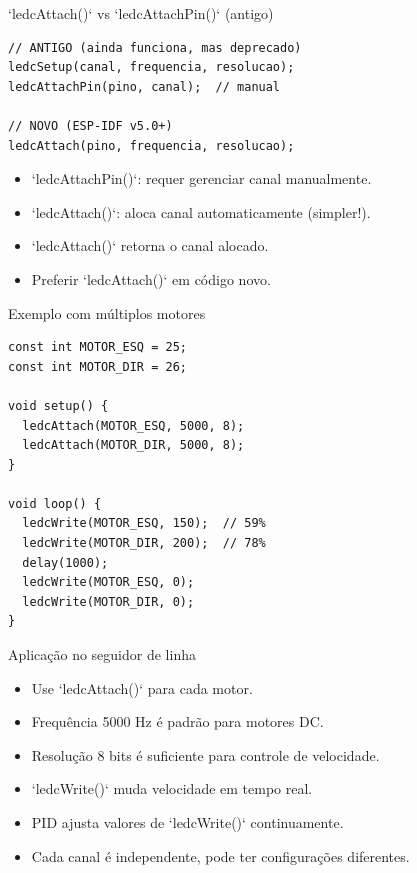 \documentclass[10pt]{beamer}
\begin{document}
\begin{frame}[fragile]{`ledcAttach()` vs `ledcAttachPin()` (antigo)}
\begin{lstlisting}
// ANTIGO (ainda funciona, mas deprecado)
ledcSetup(canal, frequencia, resolucao);
ledcAttachPin(pino, canal);  // manual

// NOVO (ESP-IDF v5.0+)
ledcAttach(pino, frequencia, resolucao);
\end{lstlisting}

  \begin{itemize}
    \item `ledcAttachPin()`: requer gerenciar canal manualmente.
    \item `ledcAttach()`: aloca canal automaticamente (simpler!).
    \item `ledcAttach()` retorna o canal alocado.
    \item Preferir `ledcAttach()` em código novo.
  \end{itemize}
\end{frame}

\begin{frame}[fragile]{Exemplo com múltiplos motores}
\begin{lstlisting}
const int MOTOR_ESQ = 25;
const int MOTOR_DIR = 26;

void setup() {
  ledcAttach(MOTOR_ESQ, 5000, 8);
  ledcAttach(MOTOR_DIR, 5000, 8);
}

void loop() {
  ledcWrite(MOTOR_ESQ, 150);  // 59%
  ledcWrite(MOTOR_DIR, 200);  // 78%
  delay(1000);
  ledcWrite(MOTOR_ESQ, 0);
  ledcWrite(MOTOR_DIR, 0);
}
\end{lstlisting}
\end{frame}

\begin{frame}{Aplicação no seguidor de linha}
  \begin{itemize}
    \item Use `ledcAttach()` para cada motor.
    \item Frequência 5000 Hz é padrão para motores DC.
    \item Resolução 8 bits é suficiente para controle de velocidade.
    \item `ledcWrite()` muda velocidade em tempo real.
    \item PID ajusta valores de `ledcWrite()` continuamente.
    \item Cada canal é independente, pode ter configurações diferentes.
  \end{itemize}
\end{frame}
\end{document}
